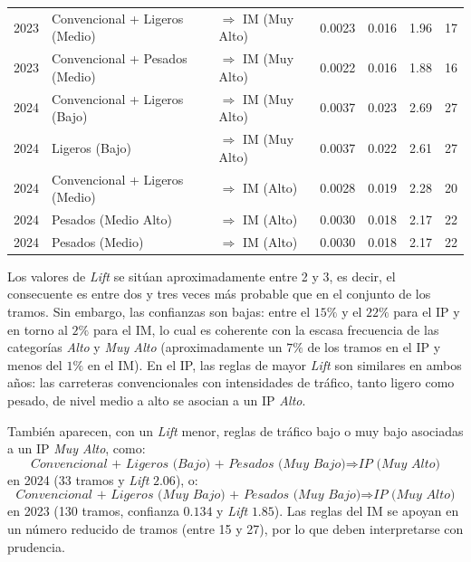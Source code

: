 \documentclass[twoside,a4paper,12pt,onecolumn,openany]{book}
\begin{document}
\begin{table}[H]
{\begin{tabular}{cllcccc}
        2023 & Convencional + Ligeros (Medio) & $\Rightarrow$ IM (Muy Alto) & 0.0023 & 0.016 & 1.96 & 17 \\
        2023 & Convencional + Pesados (Medio) & $\Rightarrow$ IM (Muy Alto) & 0.0022 & 0.016 & 1.88 & 16 \\
        \midrule
        2024 & Convencional + Ligeros (Bajo) & $\Rightarrow$ IM (Muy Alto) & 0.0037 & 0.023 & 2.69 & 27 \\
        2024 & Ligeros (Bajo) & $\Rightarrow$ IM (Muy Alto) & 0.0037 & 0.022 & 2.61 & 27 \\
        2024 & Convencional + Ligeros (Medio) & $\Rightarrow$ IM (Alto) & 0.0028 & 0.019 & 2.28 & 20 \\
        2024 & Pesados (Medio Alto) & $\Rightarrow$ IM (Alto) & 0.0030 & 0.018 & 2.17 & 22 \\
        2024 & Pesados (Medio) & $\Rightarrow$ IM (Alto) & 0.0030 & 0.018 & 2.17 & 22 \\
        \bottomrule
    \end{tabular}
    }
\end{table}

\vspace{0.5cm}

Los valores de \textit{Lift} se sitúan aproximadamente entre 2 y 3, es decir, el consecuente es entre dos y tres veces más probable que en el conjunto de los tramos. Sin embargo, las confianzas son bajas: entre el $15\%$ y el $22\%$ para el IP y en torno al $2\%$ para el IM, lo cual es coherente con la escasa frecuencia de las categorías \textit{Alto} y \textit{Muy Alto} (aproximadamente un $7\%$ de los tramos en el IP y menos del $1\%$ en el IM). En el IP, las reglas de mayor \textit{Lift} son similares en ambos años: las carreteras convencionales con intensidades de tráfico, tanto ligero como pesado, de nivel medio a alto se asocian a un IP \textit{Alto}. 

\vspace{0.5cm}

También aparecen, con un \textit{Lift} menor, reglas de tráfico bajo o muy bajo asociadas a un IP \textit{Muy Alto}, como:
\[
\textit{Convencional + Ligeros (Bajo) + Pesados (Muy Bajo)} \Rightarrow \textit{IP (Muy Alto)}
\]
en 2024 (33 tramos y \textit{Lift} $2.06$), o:
\[
\textit{Convencional + Ligeros (Muy Bajo) + Pesados (Muy Bajo)} \Rightarrow \textit{IP (Muy Alto)}
\]
en 2023 (130 tramos, confianza $0.134$ y \textit{Lift} $1.85$). Las reglas del IM se apoyan en un número reducido de tramos (entre 15 y 27), por lo que deben interpretarse con prudencia.
\end{document}
